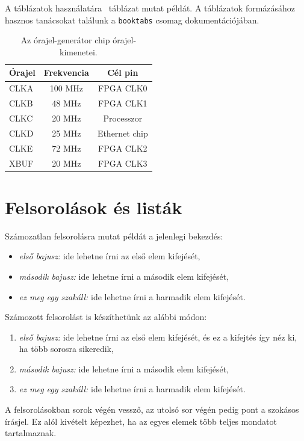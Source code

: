 A táblázatok használatára ~táblázat mutat példát. A táblázatok formázásához hasznos tanácsokat találunk a \verb+booktabs+ csomag dokumentációjában.

\begin{table}[ht]
	\footnotesize
	\centering
	\begin{tabular}{ l c c }
		\toprule
		Órajel & Frekvencia & Cél pin \\
		\midrule
		CLKA & 100 MHz & FPGA CLK0\\
		CLKB & 48 MHz  & FPGA CLK1\\
		CLKC & 20 MHz  & Processzor\\
		CLKD & 25 MHz  & Ethernet chip \\
		CLKE & 72 MHz  & FPGA CLK2\\
		XBUF & 20 MHz  & FPGA CLK3\\
		\bottomrule
	\end{tabular}
	\caption{Az órajel-generátor chip órajel-kimenetei.}
	\label{tab:TabularExample}
\end{table}


\section{Felsorolások és listák}
Számozatlan felsorolásra mutat példát a jelenlegi bekezdés:
\begin{itemize}
	\item \emph{első bajusz:} ide lehetne írni az első elem kifejését,
	\item \emph{második bajusz:} ide lehetne írni a második elem kifejését,
	\item \emph{ez meg egy szakáll:} ide lehetne írni a harmadik elem kifejését.
\end{itemize}

Számozott felsorolást is készíthetünk az alábbi módon:
\begin{enumerate}
	\item \emph{első bajusz:} ide lehetne írni az első elem kifejését, és ez a kifejtés így néz ki, ha több sorosra sikeredik,
	\item \emph{második bajusz:} ide lehetne írni a második elem kifejését,
	\item \emph{ez meg egy szakáll:} ide lehetne írni a harmadik elem kifejését.
\end{enumerate}
A felsorolásokban sorok végén vessző, az utolsó sor végén pedig pont a szokásos írásjel. Ez alól kivételt képezhet, ha az egyes elemek több teljes mondatot tartalmaznak.

